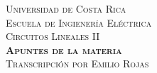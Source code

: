 \begin{titlepage}
  \vspace*{\fill}
  \begin{center}

    \textsc{\Large Universidad de Costa Rica}\\
    [0.25in]

    \textsc{\Large Escuela de Ingienería Eléctrica}\\
    [0.55in]

    \textsc{\Large Circuitos Lineales II}\\
    [0.25in]

    \textsc{\huge \bfseries Apuntes de la materia}\\
    [0.5in]

    \textsc{\large Transcripción por Emilio Rojas}

  \end{center}
  \vspace*{\fill}
\end{titlepage}

